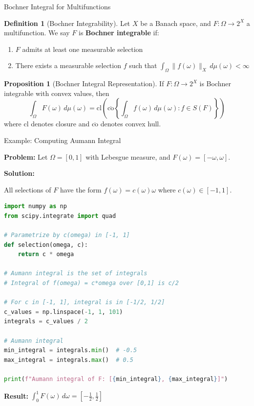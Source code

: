 \documentclass[aspectratio=169,10pt]{beamer}
\theoremstyle{definition}
\newtheorem{defn}{Definition}[section]
\newtheorem{prop}{Proposition}[section]
\begin{document}
\begin{frame}{Bochner Integral for Multifunctions}

\begin{defn}[Bochner Integrability]
Let $X$ be a Banach space, and $F: \Omega \to 2^X$ a multifunction. We say $F$ is \textbf{Bochner integrable} if:
\begin{enumerate}
    \item $F$ admits at least one measurable selection
    \item There exists a measurable selection $f$ such that $\int_\Omega \|f(\omega)\|_X \, d\mu(\omega) < \infty$
\end{enumerate}
\end{defn}

\vspace{0.3cm}

\begin{prop}[Bochner Integral Representation]
If $F: \Omega \to 2^X$ is Bochner integrable with convex values, then
\[
\int_\Omega F(\omega) \, d\mu(\omega) = \text{cl}\left(\overline{\text{co}} \left\{ \int_\Omega f(\omega) \, d\mu(\omega) : f \in S(F) \right\}\right)
\]
where $\text{cl}$ denotes closure and $\overline{\text{co}}$ denotes convex hull.
\end{prop}

\end{frame}

\begin{frame}[fragile]{Example: Computing Aumann Integral}

\textbf{Problem:} Let $\Omega = [0,1]$ with Lebesgue measure, and $F(\omega) = [-\omega, \omega]$.

\textbf{Solution:}

All selections of $F$ have the form $f(\omega) = c(\omega) \omega$ where $c(\omega) \in [-1, 1]$.

\begin{lstlisting}[language=Python]
import numpy as np
from scipy.integrate import quad

# Parametrize by c(omega) in [-1, 1]
def selection(omega, c):
    return c * omega

# Aumann integral is the set of integrals
# Integral of f(omega) = c*omega over [0,1] is c/2

# For c in [-1, 1], integral is in [-1/2, 1/2]
c_values = np.linspace(-1, 1, 101)
integrals = c_values / 2

# Aumann integral
min_integral = integrals.min()  # -0.5
max_integral = integrals.max()  # 0.5

print(f"Aumann integral of F: [{min_integral}, {max_integral}]")
\end{lstlisting}

\vspace{0.2cm}

\textbf{Result:} $\int_0^1 F(\omega) \, d\omega = [-\tfrac{1}{2}, \tfrac{1}{2}]$

\end{frame}
\end{document}
